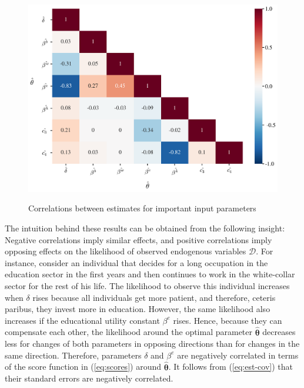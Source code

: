 \documentclass[a4paper,12pt]{article}
\begin{document}
\begin{figure}[H]
	\caption{Correlations between estimates for important input parameters}
	\centering
	\includegraphics[scale=0.45]{../../../figures/heatmap_corr_chol}
	\label{fig:corr}
\end{figure}
\noindent
The intuition behind these results can be obtained from the following insight: Negative correlations imply similar effects, and positive correlations imply opposing effects on the likelihood of observed endogenous variables $\pmb{\mathcal{D}}$. For instance, consider an individual that decides for a long occupation in the education sector in the first years and then continues to work in the white-collar sector for the rest of his life. The likelihood to observe this individual increases when $\delta$ rises because all individuals get more patient, and therefore, ceteris paribus, they invest more in education. However, the same likelihood also increases if the educational utility constant $\beta^e$ rises. Hence, because they can compensate each other, the likelihood around the optimal parameter $\pmb{\hat{\theta}}$ decreases less for changes of both parameters in opposing directions than for changes in the same direction. Therefore, parameters $\delta$ and $\beta^e$ are negatively correlated in terms of the score function in (\ref{eq:scores}) around $\pmb{\hat{\theta}}$. It follows from (\ref{eq:est-cov}) that their standard errors are negatively correlated.
\end{document}
